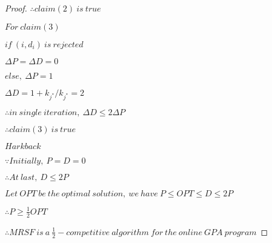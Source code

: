 \begin{proof}
{    \par \(\therefore claim(2)\ is\ true\)
    \par \(For\ claim(3)\)
    \par \(if\ (i, d_i)\ is\ rejected\)
    \par \(\Delta P = \Delta D = 0\)
    \par \(else,\ \Delta P = 1\)
    \par \(\Delta D = 1 + k_{j^*}/k_{j^*} = 2\)
    \par \(\therefore in\ single\ iteration,\ \Delta D \leq 2\Delta P\)
    \par \(\therefore claim(3)\ is\ true\)
    \par \(Hark back\)
    \par \(\because Initially,\ P=D=0\)
    \par \(\therefore At\ last,\ D\leq 2P\)
    \par \(Let\ OPT\ be\ the\ optimal\ solution,\ we\ have\ P\leq OPT\leq D\leq 2P\)
    \par \(\therefore P\geq \frac12 OPT\)
    \par \(\therefore MRSF\ is\ a\ \frac12-competitive\ algorithm\ for\ the\ online\ GPA\ program\)
}
\end{proof}


